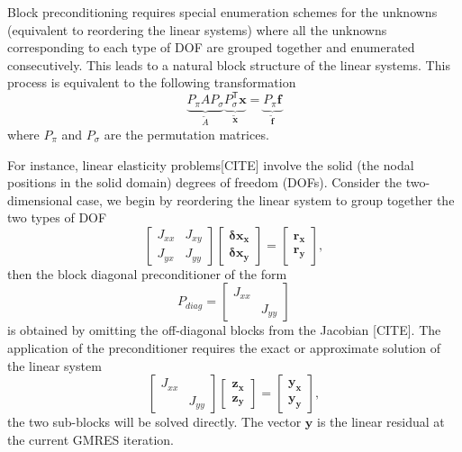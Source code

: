 Block preconditioning requires special enumeration schemes for the unknowns 
(equivalent to reordering the linear systems) where all the unknowns 
corresponding to each type of DOF are grouped together and enumerated 
consecutively. This leads to a natural block structure of the linear systems.
This process is equivalent to the following transformation
\begin{equation*}
  \underbrace{P_{\pi} A P_{\sigma}}_{\tilde{A}} \underbrace{P_{\sigma}^{\mathsf{T}}\mathbf{x}}_{\tilde{\mathbf{x}}}=\underbrace{P_{\pi}\mathbf{f}}_{\tilde{\mathbf{f}}}
\end{equation*}
where $P_{\pi}$ and $P_{\sigma}$ are the permutation matrices.

For instance, linear elasticity problems[CITE] involve the solid (the nodal positions in the solid domain) degrees of freedom (DOFs). Consider the two-dimensional case, we begin by reordering the linear system to group together the two types of DOF 
\begin{equation*}
\begin{bmatrix}
 J_{xx} & J_{xy} \\
 J_{yx} & J_{yy}
\end{bmatrix}
\begin{bmatrix}
 \mathbf{\delta x_x} \\
 \mathbf{\delta x_y} 
\end{bmatrix}
=
\begin{bmatrix}
 \mathbf{r_x} \\
 \mathbf{r_y}
\end{bmatrix},
\end{equation*}
then the block diagonal preconditioner of the form 
\begin{equation*}
P_{diag}=
\begin{bmatrix}
J_{xx}&     \\
      &J_{yy}
\end{bmatrix}
\end{equation*}
is obtained by omitting the off-diagonal blocks from the Jacobian [CITE].
The application of the preconditioner requires the exact or approximate 
solution of the linear system
\begin{equation*}
\begin{bmatrix}
J_{xx}& \\
      &J_{yy}
\end{bmatrix}
\begin{bmatrix}
\mathbf{z_x}\\
\mathbf{z_y}
\end{bmatrix}
=
\begin{bmatrix}
\mathbf{y_x}\\
\mathbf{y_y}
\end{bmatrix},
\end{equation*}
the two sub-blocks will be solved directly. The vector $\mathbf{y}$ is the 
linear residual at the current GMRES iteration.

